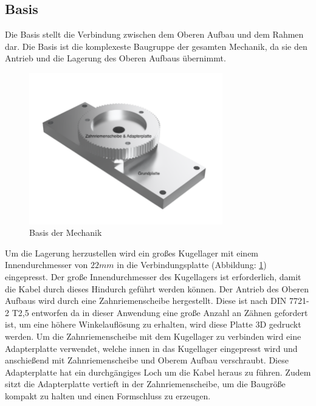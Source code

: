 \subsection{Basis}
Die Basis stellt die Verbindung zwischen dem Oberen Aufbau und dem Rahmen dar. Die Basis ist die komplexeste Baugruppe der gesamten Mechanik, da sie den Antrieb und die Lagerung des Oberen Aufbaus übernimmt. 
\begin{figure}[H]
	\centering
	\includegraphics[width=0.75\textwidth]{images/Mechanik/Basis}
	\caption{Basis der Mechanik}
	\label{basis}
\end{figure}
Um die Lagerung herzustellen wird ein großes Kugellager mit einem Innendurchmesser von $22mm$ in die Verbindungsplatte (Abbildung: \ref{basis}) eingepresst. Der große Innendurchmesser des Kugellagers ist erforderlich, damit die Kabel durch dieses Hindurch geführt werden können. Der Antrieb des Oberen Aufbaus wird durch eine Zahnriemenscheibe hergestellt. Diese ist nach DIN 7721-2 T2,5 \cite{Tabellenbuch} entworfen da in dieser Anwendung eine große Anzahl an Zähnen gefordert ist, um eine höhere Winkelauflösung zu erhalten, wird diese Platte 3D gedruckt werden. Um die Zahnriemenscheibe mit dem Kugellager zu verbinden wird eine Adapterplatte verwendet, welche innen in das Kugellager eingepresst wird und anschießend mit Zahnriemenscheibe und Oberem Aufbau verschraubt. Diese Adapterplatte hat ein durchgängiges Loch um die Kabel heraus zu führen. Zudem sitzt die Adapterplatte vertieft in der Zahnriemenscheibe, um die Baugröße kompakt zu halten und einen Formschluss zu erzeugen. 
